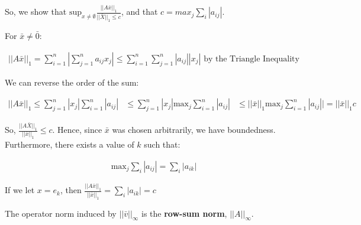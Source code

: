 So, we show that $\text{sup}_{x \neq \emptyset} \frac{||A\bar{x}||_1}{||\bar{X}||_1 \leq c}$, and that $c = max_j \sum_i |a_{ij}|$.

For $\bar{x} \neq \bar{0}$:

\begin{align*}
  ||A\bar{x}||_1 = \sum_{i=1}^n |\sum_{j=1}^n a_{ij} x_j| \leq \sum_{i=1}^n \sum_{j=1}^n |a_{ij}| |x_j|\text{ by the Triangle Inequality}
\end{align*}

We can reverse the order of the sum:

\begin{align*}
  ||A\bar{x}||_1 \leq \sum_{j=1}^n |x_j| \sum_{i=1}^n |a_{ij}| &\leq \sum_{j=1}^n |x_j| \text{max}_j \sum_{i=1}^n |a_{ij}|
  &\leq ||\bar{x}||_1 \text{max}_j \sum_{i=1}^n |a_{ij}|| = ||\bar{x}||_1 c
\end{align*}

So, $\frac{||A\bar{X}||_1}{||\bar{x}||_1} \leq c$. Hence, since $\bar{x}$ was chosen arbitrarily, we have boundedness. Furthermore, there exists a value of $k$ such that:

\begin{align*}
  \text{max}_j \sum_i |a_{ij}| = \sum_i |a_{ik}|
\end{align*}

If we let $x = e_k$, then $\frac{||A\bar{x}||_1}{||\bar{x}||_1} = \sum_i |a_{ik}| = c$

The operator norm induced by $||\bar{v}||_\infty$ is the \textbf{row-sum norm}, $||A||_\infty$.
